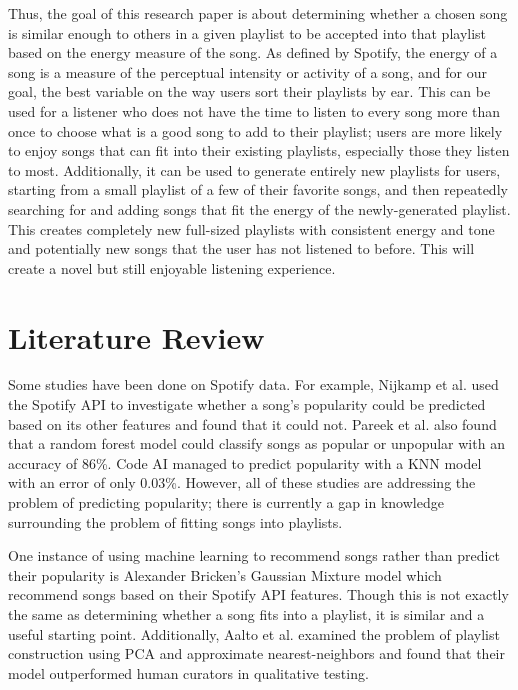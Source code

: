 \documentclass[titlepage]{article}
\begin{document}
Thus, the goal of this research paper is about determining whether a chosen song is similar enough to others in a given playlist to be accepted into that playlist based on the energy measure of the song. As defined by Spotify, the energy of a song is a measure of the perceptual intensity or activity of a song, and for our goal, the best variable on the way users sort their playlists by ear. This can be used for a listener who does not have the time to listen to every song more than once to choose what is a good song to add to their playlist; users are more likely
to enjoy songs that can fit into their existing playlists, especially those they listen to most.
Additionally, it can be used to generate entirely new playlists for users, starting from a small
playlist of a few of their favorite songs, and then repeatedly searching for and adding songs that
fit the energy of the newly-generated playlist. This creates completely new full-sized playlists 
with consistent energy and tone and potentially new songs that the user has not listened to before.
This will create a novel but still enjoyable listening experience. 

\section{Literature Review}
Some studies have been done on Spotify data. For example, Nijkamp et al. used the Spotify API
to investigate whether a song's popularity could be predicted based on its other features and found
that it could not. Pareek et al. also found that a random forest model could classify songs
as popular or unpopular with an accuracy of 86\%. Code AI managed to predict popularity with a KNN
model with an error of only 0.03\%. However, all of these studies are addressing the problem
of predicting popularity; there is currently a gap in knowledge surrounding the problem of fitting
songs into playlists.

One instance of using machine learning to recommend songs rather than predict their popularity is
Alexander Bricken's Gaussian Mixture model which recommend songs based on their Spotify API
features. Though this is not exactly the same as determining whether a song fits into a playlist,
it is similar and a useful starting point. Additionally, Aalto et al. examined the problem of 
playlist construction using PCA and approximate nearest-neighbors and found that their model 
outperformed human curators in qualitative testing.
\end{document}
